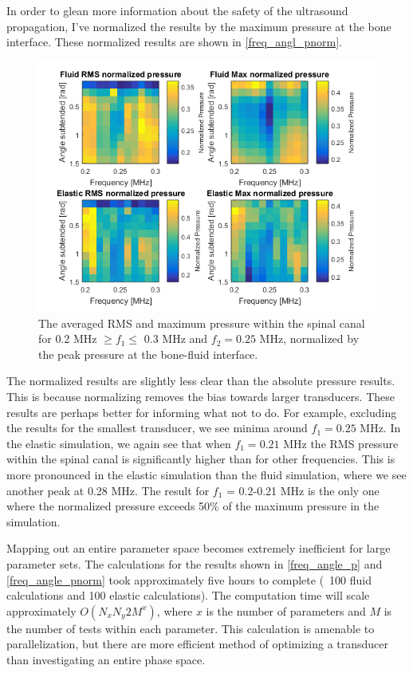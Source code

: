 \documentclass[10pt,a4paper]{article}
\begin{document}
  
In order to glean more information about the safety of the ultrasound propagation, I've normalized the results by the maximum pressure at the bone interface. These normalized results are shown in \autoref{freq_angl_pnorm}. 
\begin{figure}[H]
\includegraphics[scale=0.8]{freq_angle_pnorm}
\caption{The averaged  RMS and maximum pressure within the spinal canal for   0.2 MHz $\geq f_1 \leq$ 0.3 MHz and $f_2 = 0.25$ MHz, normalized by the peak pressure at the bone-fluid interface.}
\label{freq_angle_pnorm}
\end{figure}

The normalized results are slightly less clear than the absolute pressure results. This is because normalizing removes the bias towards larger transducers. These results are perhaps better for informing what not to do. For example, excluding the results for the smallest transducer, we see minima around $f_1 = 0.25$ MHz. In the elastic simulation, we again see that when $f_1 = 0.21$ MHz the RMS pressure within the spinal canal is significantly higher than for other frequencies. This is more pronounced in the elastic simulation than the fluid simulation, where we see another peak at 0.28 MHz. The result for $f_1$ = 0.2-0.21 MHz is the only one where the normalized pressure exceeds 50\% of the maximum pressure in the simulation. 

Mapping out an entire parameter space becomes extremely inefficient for large parameter sets. The calculations for the results shown in \autoref{freq_angle_p} and \autoref{freq_angle_pnorm} took approximately five hours to complete (~100 fluid calculations and 100 elastic calculations). The computation time will scale approximately $O(N_xN_y2M^x)$, where $x$ is the number of parameters and $M$ is the number of tests within each parameter. This calculation is amenable to parallelization, but there are more efficient method of optimizing a transducer than investigating an entire phase space. 

\newpage
{}

\end{document}
